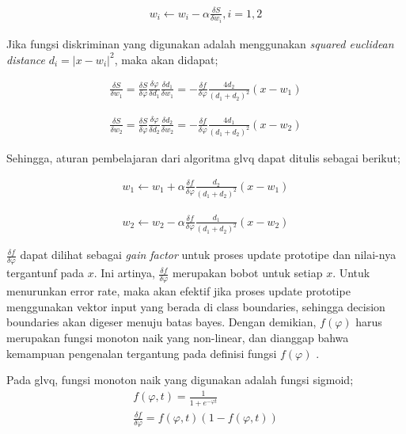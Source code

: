 \begin{align}
\label{eq:genuprule}
	w_i \leftarrow w_i - \alpha \frac{\delta S}{\delta w_i}, i = 1, 2
\end{align}


\noindent Jika fungsi diskriminan yang digunakan adalah menggunakan
\textit{squared euclidean distance} $d_i = \lvert x - w_i\rvert ^2$,  maka akan
didapat;

\begin{align}
\label{eq:turunan1a}
	\frac{\delta S}{\delta w_1} =  
	\frac{\delta S}{\delta \varphi} \frac{\delta \varphi}{\delta d_1} \frac{\delta
	d_1}{\delta w_1} =
	- \frac{\delta f}{\delta \varphi} \frac{4d_2}{(d_1 + d_2)^2} (x - w_1)
\end{align}

\begin{align}
\label{eq:turunan1b}
	\frac{\delta S}{\delta w_2} =  
	\frac{\delta S}{\delta \varphi} \frac{\delta \varphi}{\delta d_2} \frac{\delta
	d_2}{\delta w_2} =
	- \frac{\delta f}{\delta \varphi} \frac{4d_1}{(d_1 + d_2)^2} (x - w_2)
\end{align}

\noindent Sehingga, aturan pembelajaran dari algoritma \gls{glvq} dapat ditulis
sebagai berikut;

\begin{align}
\label{eq:glvq-rulea}
	w_1 \leftarrow w_1 + \alpha   
	\frac{\delta f}{\delta \varphi} \frac{d_2}{(d_1 + d_2)^2} (x - w_1)
\end{align}

\begin{align}
\label{eq:glvq-ruleb}
	w_2 \leftarrow w_2 - \alpha   
	\frac{\delta f}{\delta \varphi} \frac{d_1}{(d_1 + d_2)^2} (x - w_2)
\end{align}

$\frac{\delta f}{\delta \varphi}$ dapat dilihat sebagai \emph{gain factor} untuk
proses update prototipe dan nilai-nya tergantunf pada $x$. Ini artinya, 
$\frac{\delta f}{\delta \varphi}$ merupakan bobot untuk setiap $x$. Untuk
menurunkan error rate, maka akan efektif jika proses update prototipe
menggunakan vektor input yang berada di class boundaries, sehingga decision
boundaries akan digeser menuju batas bayes. Dengan demikian, $f(\varphi)$ harus
merupakan fungsi monoton naik yang non-linear, dan dianggap bahwa kemampuan
pengenalan tergantung pada definisi fungsi $f(\varphi)$ .

Pada \gls{glvq}, fungsi monoton naik yang digunakan adalah fungsi sigmoid;
\begin{align}
\label{eq:sigmoid}
	f(\varphi, t) = \frac{1}{1 + e^{-\varphi t}} \\
\label{eq:deltasigmoid}
	\frac{\delta f}{\delta \varphi} = f(\varphi, t) (1 - f(\varphi , t))
\end{align} 

